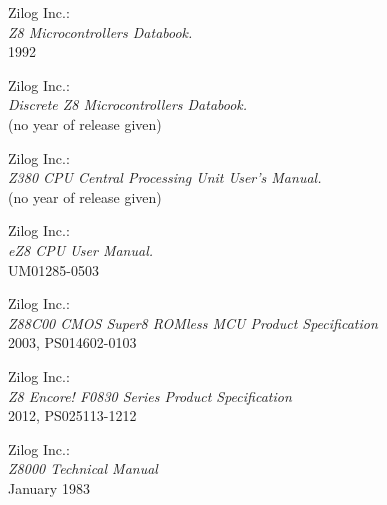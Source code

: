  Zilog Inc.: \\
		{\em Z8 Microcontrollers Databook.\/} \\
		1992

 Zilog Inc.: \\
		{\em Discrete Z8 Microcontrollers Databook.\/} \\
		(no year of release given)

 Zilog Inc.: \\
		{\em Z380 CPU Central Processing Unit User's
		Manual.\/} \\
		(no year of release given)

 Zilog Inc.: \\
		{\em eZ8 CPU User Manual.\/} \\
		UM01285-0503

 Zilog Inc.: \\
		{\em Z88C00 CMOS Super8 ROMless MCU Product Specification\/} \\
		2003, PS014602-0103

 Zilog Inc.: \\
		{\em Z8 Encore! F0830 Series Product Specification\/} \\
		2012, PS025113-1212

 Zilog Inc.: \\
		{\em Z8000 Technical Manual\/} \\
		January 1983
